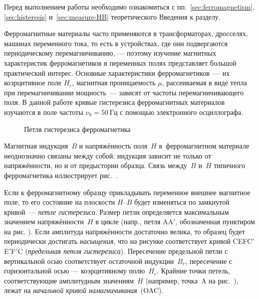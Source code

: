 \label{lab:4-5}



Перед выполнением работы необходимо ознакомиться с
пп.~\ref{sec:ferromagnetism}, \ref{sec:histeresis} и~\ref{sec:measure-HB} 
теоретического Введения к разделу.


Ферромагнитные материалы часто применяются в трансформаторах, дросселях, машинах
переменного тока, то есть в устройствах, где они подвергаются периодическому
перемагничиванию, --- поэтому изучение магнитных характеристик 
ферромагнетиков в переменных полях представляет большой практический интерес. 
Основные характеристики ферромагнетиков~--- их коэрцитивное поле
$H_c$, магнитная проницаемость $\mu$, 
рассеиваемая в виде тепла при перемагничивании мощность~--- зависят
от частоты перемагничивающего поля. В данной работе
кривые гистерезиса ферромагнитных материалов изучаются в поле частоты
$\nu_0 = 50~Гц$ с помощью электронного осциллографа.

\begin{figure}[h!]
    \centering
    \caption{Петля гистерезиса ферромагнетика}
\end{figure}

Магнитная индукция~${B}$ и напряжённость поля~${H}$ в~ферромагнитном материале 
неоднозначно связаны между собой: индукция зависит не только от напряжённости, 
но и от предыстории образца. Связь между~$B$ и~$H$ типичного ферромагнетика 
иллюстрирует рис.~.


Если к ферромагнитному образцу прикладывать переменное внешнее магнитное поле,
то его состояние на плоскости $H$--$B$ будет изменяться по замкнутой кривой~---
\emph{петле гистерезиса}. Размер петли определяется максимальным
значением напряжённости~$H$ в цикле (напр.,
петля AA$'$, обозначенная пунктиром на рис. ). 
Если амплитуда напряжённости достаточно
велика, то образец будет периодически достигать \emph{насыщения}, 
что на рисунке соответствует кривой CEFC$'$E$'$F$'$C
(\emph{предельная петля гистерезиса}).
Пересечение предельной петли с вертикальной осью соответствует
остаточной индукции~$B_r$, пересечение с горизонтальной осью ---
коэрцитивному полю~$H_c$.
Крайние точки петель, соответствующие амплитудным значениям~$H$ 
(например, точка~A на рис.~), лежат на 
\emph{начальной кривой намагничивания}~(OAC).

